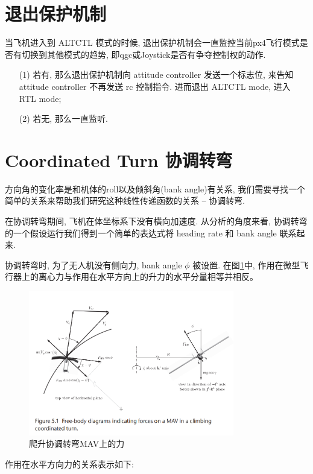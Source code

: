     \section{退出保护机制}
    \label{sec:protect}
    当飞机进入到 ALTCTL 模式的时候, 退出保护机制会一直监控当前px4飞行模式是否有切换到其他模式的趋势, 即qgc或Joystick是否有争夺控制权的动作. 
    \begin{itemize}
      \item[(1)] 若有, 那么退出保护机制向 attitude controller 发送一个标志位, 来告知 attitude controller 不再发送 rc 控制指令. 进而退出 ALTCTL mode, 进入 RTL mode;
      \item[(2)] 若无, 那么一直监听.
    \end{itemize}
    \clearpage
    \section{Coordinated Turn 协调转弯}
    \label{sec:turn}
    方向角的变化率是和机体的roll以及倾斜角(bank angle)有关系, 我们需要寻找一个简单的关系来帮助我们研究这种线性传递函数的关系 -- 协调转弯. \par
    在协调转弯期间, 飞机在体坐标系下没有横向加速度. 从分析的角度来看, 协调转弯的一个假设运行我们得到一个简单的表达式将 heading rate 和 bank angle 联系起来. \par
    协调转弯时, 为了无人机没有侧向力, bank angle $\phi$ 被设置.
    在图\ref{fig:1}中, 作用在微型飞行器上的离心力与作用在水平方向上的升力的水平分量相等并相反。
    \begin{figure}[htpb]
        \centering
        \includegraphics[width=0.8\textwidth]{pictures/chapter3/5_1.png}
        \caption{爬升协调转弯MAV上的力}
        \label{fig:1}
    \end{figure}
    \par 作用在水平方向力的关系表示如下: 
